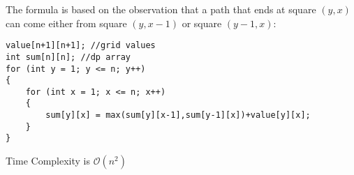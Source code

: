 \documentclass[twoside,12pt,a4paper,english]{book}
\theoremstyle{definition}
\theoremstyle{problemstyle}
\theoremstyle{problemstyle}
\theoremstyle{problemstyle}
\begin{document}
\begin{tcolorbox}[title=Solution]

The formula is based on the observation
that a path that ends at square $(y,x)$
can come either from square $(y,x-1)$
or square $(y-1,x)$:
\begin{center}
\end{center}
\begin{lstlisting}
value[n+1][n+1]; //grid values
int sum[n][n]; //dp array
for (int y = 1; y <= n; y++)
{
    for (int x = 1; x <= n; x++)
    {
        sum[y][x] = max(sum[y][x-1],sum[y-1][x])+value[y][x];
    }
}
\end{lstlisting}
Time Complexity is $\mathcal{O}(n^2)$
\end{tcolorbox}
\newpage
\end{document}

